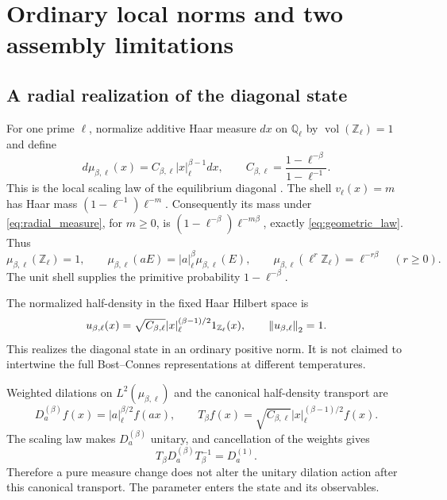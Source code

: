 \section{Ordinary local norms and two assembly limitations}
\label{sec:norms}

\subsection{A radial realization of the diagonal state}

For one prime $\ell$, normalize additive Haar measure $dx$ on
$\mathbb Q_\ell$ by $\operatorname{vol}(\mathbb Z_\ell)=1$ and define
\begin{equation}
 d\mu_{\beta,\ell}(x)=C_{\beta,\ell}|x|_\ell^{\beta-1}dx,
 \qquad C_{\beta,\ell}=\frac{1-\ell^{-\beta}}{1-\ell^{-1}}.
 \label{eq:radial_measure}
\end{equation}
This is the local scaling law of the equilibrium diagonal
\cite[Section~2]{Neshveyev}. The shell $v_\ell(x)=m$ has Haar mass
$(1-\ell^{-1})\ell^{-m}$. Consequently its mass under
\eqref{eq:radial_measure}, for $m\ge0$, is
$(1-\ell^{-\beta})\ell^{-m\beta}$, exactly
\eqref{eq:geometric_law}. Thus
\begin{equation}
 \mu_{\beta,\ell}(\mathbb Z_\ell)=1,\qquad
 \mu_{\beta,\ell}(aE)=|a|_\ell^\beta\mu_{\beta,\ell}(E),\qquad
 \mu_{\beta,\ell}(\ell^r\mathbb Z_\ell)=\ell^{-r\beta}
 \quad(r\ge0).
\end{equation}
The unit shell supplies the primitive probability $1-\ell^{-\beta}$.

The normalized half-density in the fixed Haar Hilbert space is
\begin{equation}
 u_{\beta,\ell}(x)=\sqrt{C_{\beta,\ell}}
 |x|_\ell^{(\beta-1)/2}1_{\mathbb Z_\ell}(x),\qquad
 \left\lVert u_{\beta,\ell}\right\rVert_2=1.
 \label{eq:half_density}
\end{equation}
This realizes the diagonal state in an ordinary positive norm. It is
not claimed to intertwine the full Bost--Connes representations at
different temperatures.

Weighted dilations on $L^2(\mu_{\beta,\ell})$ and the canonical
half-density transport are
\begin{equation}
 D_a^{(\beta)}f(x)=|a|_\ell^{\beta/2}f(ax),\qquad
 T_\beta f(x)=\sqrt{C_{\beta,\ell}}|x|_\ell^{(\beta-1)/2}f(x).
\end{equation}
The scaling law makes $D_a^{(\beta)}$ unitary, and cancellation of the
weights gives
\begin{equation}
 T_\beta D_a^{(\beta)}T_\beta^{-1}=D_a^{(1)}.
 \label{eq:transported_dilation}
\end{equation}
Therefore a pure measure change does not alter the unitary dilation
action after this canonical transport. The parameter enters the state
and its observables.

